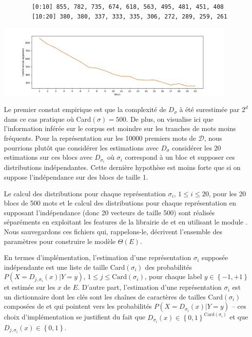 \documentclass[a4paper, french]{article}
\begin{document}
\begin{table}[h]
\begin{center}
    \caption{\'Evaluation empirique de la complexit\'e de repr\'esentation}
    \label{table:combinaisons_decalages}
    \vskip 4mm
    \begin{lstlisting}
        [0:10] 855, 782, 735, 674, 618, 563, 495, 481, 451, 408
        [10:20] 380, 380, 337, 333, 335, 306, 272, 289, 259, 261
    \end{lstlisting}
    \includegraphics[width=12cm]{cn_decalages}
\end{center}
\end{table}

Le premier constat empirique est que la complexit\'e de $D_\sigma$ \`a \'et\'e
surestim\'ee par $2^d$ dans ce cas pratique o\`u Card$(\sigma)=500$. De plus,
on visualise ici que l'information inf\'er\'ee sur le corpus est moindre sur
les tranches de mots moins fr\'equents. 
%
Pour la repr\'esentation sur les 10000 premiers mots de $\mathcal{D}$, 
nous pourrions plut\^ot que consid\'erer les estimations avec $D_{\sigma}$
consid\'erer les 20 estimations sur ces blocs avec $D_{\sigma_i}$ o\`u 
$\sigma_i$ correspond \`a un bloc et supposer ces distributions
ind\'ependantes. 
Cette derni\`ere hypoth\`ese est moins forte que si on suppose 
l'ind\'ependance sur des blocs de taille 1.

Le calcul des distributions pour chaque repr\'esentation ${\sigma_i}$,
$1\leq i\leq 20$, pour les 20 blocs de 500 mots et le calcul des distributions 
pour chaque repr\'esentation en supposant l'ind\'ependance 
(donc 20 vecteurs de taille 500) 
sont r\'ealis\'es s\'epar\'ements en exploitant les features de la librairie
 de  et en utilisant le module .
Nous sauvegardons ces fichiers qui, rappelons-le, d\'ecrivent l'ensemble des
param\`etres pour construire le mod\`ele $\Theta(E)$.

En termes d'impl\'ementation, l'estimation d'une repr\'esentation $\sigma_i$ 
suppos\'ee ind\'ependante est une liste de taille Card$(\sigma_i)$ 
des probabilit\'es $P(X=D_{j,\sigma_i}(x)|Y=y)$, $1\leq j\leq \text{Card}(\sigma_i)$,
pour chaque label $y\in\left\{-1,+1\right\}$ et estim\'ee sur les $x$ de $E$.
D'autre part, l'estimation d'une repr\'esentation $\sigma_i$ est un dictionnaire
dont les cl\'es sont les cha\^ines de caract\`eres de tailles 
Card$(\sigma_i)$ compos\'ees de  et 
qui pointent vers les probabilit\'es $P(X=D_{\sigma_i}(x)|Y=y)$ -- 
ces choix d'impl\'ementation se justifient du fait que
$D_{\sigma_i}(x)\in\left\{0,1\right\}^{\text{Card}(\sigma_i)}$ et
que $D_{j,\sigma_i}(x)\in\left\{0,1\right\}$.
\end{document}
